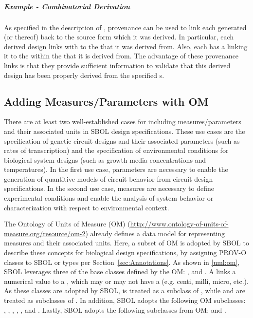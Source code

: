 \clearpage

\subparagraph{Example - Combinatorial Derivation}

As specified in the description of , provenance can be used to link each generated  (or  thereof) back to the source form which it was derived.
In particular, each derived design links with  to the  that it was derived from.  Also, each  has a  linking it to the  within the  that it is derived from.  The advantage of these provenance links is that they provide sufficient information to validate that this derived design has been properly derived from the specified s.

\subsection{Adding Measures/Parameters with OM}
\label{sec:parameters}

There are at least two well-established cases for including measures/parameters and their associated units in SBOL design specifications. These use cases are the specification of genetic circuit designs and their associated parameters (such as rates of transcription) and the specification of environmental conditions for biological system designs (such as growth media concentrations and temperatures). In the first use case, parameters are necessary to enable the generation of quantitive models of circuit behavior from circuit design specifications. In the second use case, measures are necessary to define experimental conditions and enable the analysis of system behavior or characterization with respect to environmental context.

The Ontology of Units of Measure (OM) (\url{http://www.ontology-of-units-of-measure.org/resource/om-2}) already defines a data model for representing measures and their associated units. Here, a subset of OM is adopted by SBOL to describe these concepts for biological design specifications, 
by assigning PROV-O classes to SBOL  or  types per  Section~\ref{sec:Annotations}.
%
As shown in \ref{uml:om}, SBOL leverages three of the base classes defined by the OM: ,  and . A  links a numerical value to a , which may or may not have a  (e.g. centi, milli, micro, etc.). As these classes are adopted by SBOL,  is treated as a subclass of , while  and  are treated as subclasses of . In addition, SBOL adopts the following OM  subclasses: , , , , , and . Lastly, SBOL adopts the following  subclasses from OM:  and .

